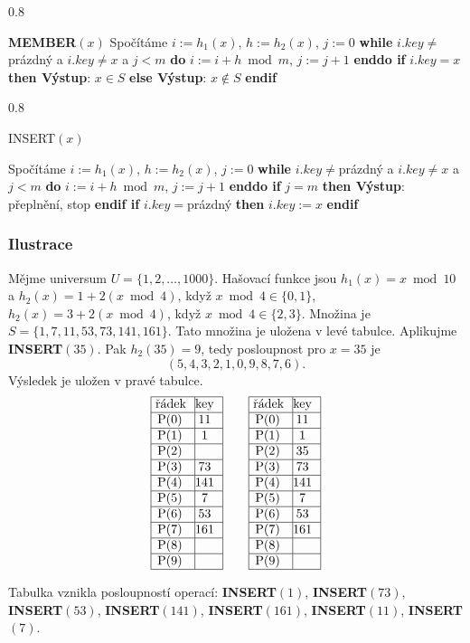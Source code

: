 \documentclass[a4paper,12pt]{article}
\newcommand{\algoritmus}[1]{
  {
  \setlength\fboxrule{0.5pt}

  \begin{boxedminipage}{0.8\textwidth}

 #1
  \end{boxedminipage}

  }
  }
\begin{document}
\algoritmus{
{\bf MEMBER$(x)$}\newline 
Spočítáme $i:=h_1(x)$, $h:=h_2(x)$, $j:=0$\newline 
{\bf while} $i.key\ne$prázdný a $i.key\ne x$ a $j<m$ {\bf do} $
i:=i+h\bmod m$, $j:=j+1$ {\bf enddo\newline 
if} $i.key=x$ {\bf then Výstup}: $x\in S$ {\bf else Výstup}: $
x\notin S$ {\bf endif
}}\algoritmus{{\bf

INSERT$(x)$}\newline 
Spočítáme $i:=h_1(x)$, $h:=h_2(x)$, $j:=0$\newline 
{\bf while} $i.key\ne$prázdný a $i.key\ne x$ a $j<m$ {\bf do} $
i:=i+h\bmod m$, $j:=j+1$ {\bf enddo\newline 
if} $j=m$ {\bf then Výstup}: přeplnění, stop {\bf endif\newline 
if} $i.key=$prázdný {\bf then} $i.key:=x$ {\bf endif}
}

\subsubsection{Ilustrace}
 Mějme universum $U=\{1,2,\dots,1000
\}$. 
Hašovací funkce jsou 
$h_1(x)=x\bmod10$ a $h_2(x)=1+2(x\bmod4)$, když 
$x\bmod4\in \{0,1\}$, $h_2(x)=3+2(x\bmod4)$, když $x\bmod4\in 
\{2,3\}$. 
Množina je  $S=\{1,7,11,53,73,141,161\}$. Tato množina je uložena v 
levé tabulce. Aplikujme {\bf INSERT$(35)$}. Pak $h_2(35)=9$, tedy 
posloupnost pro $x=35$ je 
$$(5,4,3,2,1,0,9,8,7,6).$$
Výsledek je uložen v pravé tabulce. 
$$\vbox {\hbox{\vtop{\offinterlineskip\halign{\strut\vrule\ # & \vrule\hfil# \hfil\vrule\cr\noalign{\hrule}řádek & key \hfil\cr\noalign{\hrule}P(0) & 11 \cr\noalign{\hrule}P(1) & 1 \cr\noalign{\hrule}P(2) & \hfill \cr\noalign{\hrule}P(3) & 73 \cr\noalign{\hrule}P(4) & 141 \cr\noalign{\hrule}P(5) & 7 \cr\noalign{\hrule}P(6) & 53 \cr\noalign{\hrule}P(7) & 161 \cr\noalign{\hrule}P(8) & \hfill\cr\noalign{\hrule}P(9) & \hfill \cr\noalign{\hrule}}}\qquad\vtop{\offinterlineskip\halign {\strut\vrule\ # & \vrule \hfil # \hfil \vrule\cr\noalign{\hrule}řádek & key \hfil \cr\noalign{\hrule}P(0) & 11 \cr\noalign{\hrule}P(1) & 1 \cr\noalign{\hrule}P(2) & 35 \cr\noalign{\hrule}P(3) & 73 \cr\noalign{\hrule}P(4) & 141 \cr\noalign{\hrule}P(5) & 7 \cr\noalign{\hrule}P(6) & 53 \cr\noalign{\hrule}P(7) & 161 \cr\noalign{\hrule}P(8) & \hfill \cr\noalign{\hrule}P(9) & \hfill \cr\noalign{\hrule}}}}}$$

Tabulka vznikla posloupností operací:\newline 
{\bf INSERT$(1)$}, {\bf INSERT$(73)$}, {\bf INSERT$(53)$}, 
{\bf INSERT$(141)$}, {\bf INSERT$(161)$},\newline 
{\bf INSERT$(11)$}, {\bf INSERT$(7)$}. 
\end{document}
